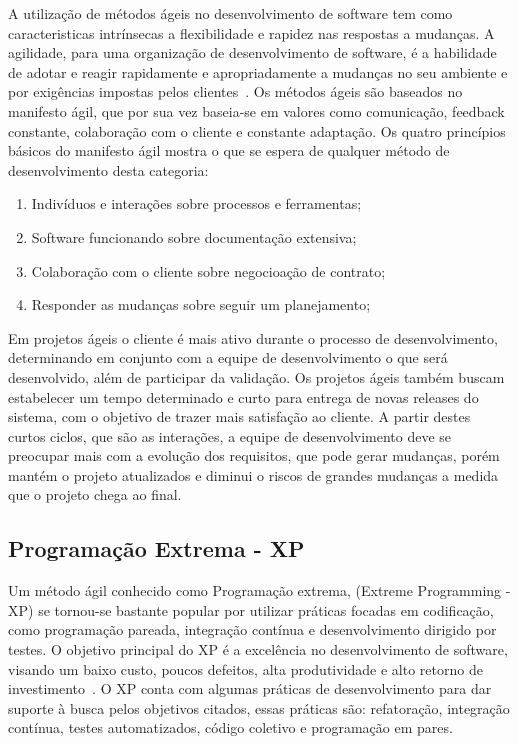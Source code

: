 A utilização de métodos ágeis no desenvolvimento de software tem como caracteristicas intrínsecas 
a flexibilidade e rapidez nas respostas a mudanças. 
%
A agilidade, para uma organização de desenvolvimento de software, é a habilidade de
adotar e reagir rapidamente e apropriadamente a mudanças no seu ambiente e por exigências
impostas pelos clientes~\cite{nerur2005}.
%
Os métodos ágeis são baseados no manifesto ágil, que por sua vez baseia-se em valores como 
comunicação, feedback constante, colaboração com o cliente e constante adaptação. Os quatro 
princípios básicos do manifesto ágil mostra o que se espera de qualquer método de desenvolvimento 
desta categoria:
%
\begin{enumerate}
\item Indivíduos  e interações sobre processos e ferramentas;
\item Software funcionando sobre documentação extensiva;
\item Colaboração com o cliente sobre negocioação de contrato;
\item Responder as  mudanças sobre seguir um planejamento;
\end{enumerate}
%
Em projetos ágeis o cliente é mais ativo durante o processo de desenvolvimento, determinando
em conjunto com a equipe de desenvolvimento o que será desenvolvido, além de participar
da validação. Os projetos ágeis também buscam estabelecer um tempo determinado e curto para entrega
de novas releases do sistema, com o objetivo de trazer mais satisfação ao cliente.
%
A partir destes curtos ciclos, que são as interações, a equipe de desenvolvimento deve
se preocupar mais com a evolução dos requisitos, que pode gerar mudanças, porém mantém o projeto
atualizados e diminui o riscos de grandes mudanças a medida que o projeto chega ao final.
%
\subsection{Programação Extrema - XP}

Um método ágil conhecido como Programação extrema, (Extreme Programming - XP) se tornou-se 
bastante popular por utilizar práticas focadas em codificação, como programação pareada, 
integração contínua e desenvolvimento dirigido por testes.
%
O objetivo principal do XP é a excelência no desenvolvimento de software, visando um baixo 
custo, poucos defeitos, alta produtividade e alto retorno de investimento~\cite{sato2007}.
O XP conta com algumas práticas de desenvolvimento para dar suporte à busca pelos objetivos 
citados, essas práticas são: refatoração, integração contínua, testes automatizados, código 
coletivo e programação em pares.





